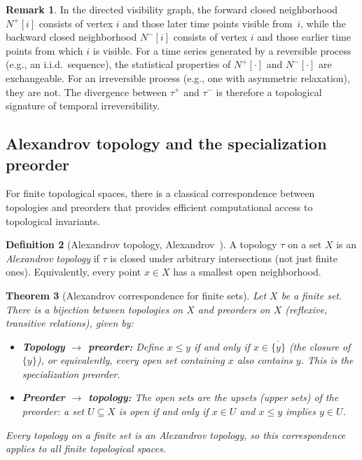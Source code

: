 \documentclass[11pt,a4paper]{article}
\theoremstyle{plain}
\newtheorem{theorem}{Theorem}[section]
\theoremstyle{definition}
\newtheorem{definition}[theorem]{Definition}
\newtheorem{remark}[theorem]{Remark}
\newcommand{\Nfwd}[1]{N^{+}[#1]}
\newcommand{\Nbwd}[1]{N^{-}[#1]}
\newcommand{\taufwd}{\tau^{+}}
\newcommand{\taubwd}{\tau^{-}}
\begin{document}
\begin{remark}\label{rem:irreversibility}
In the directed visibility graph, the forward closed neighborhood $\Nfwd{i}$
consists of vertex $i$ and those later time points visible from~$i$, while the
backward closed neighborhood $\Nbwd{i}$ consists of vertex $i$ and those
earlier time points from which $i$ is visible.  For a time series generated by
a reversible process (e.g., an i.i.d.\ sequence), the statistical properties
of $\Nfwd{\cdot}$ and $\Nbwd{\cdot}$ are exchangeable.  For an irreversible
process (e.g., one with asymmetric relaxation), they are not.  The divergence
between $\taufwd$ and $\taubwd$ is therefore a topological signature of
temporal irreversibility.
\end{remark}

\subsection{Alexandrov topology and the specialization preorder}%
\label{subsec:alexandrov}

For finite topological spaces, there is a classical correspondence between
topologies and preorders that provides efficient computational access to
topological invariants.

\begin{definition}[Alexandrov topology, Alexandrov~\cite{Alexandrov1937}]%
\label{def:alexandrov}
A topology $\tau$ on a set $X$ is an \emph{Alexandrov topology} if $\tau$ is
closed under arbitrary intersections (not just finite ones).  Equivalently,
every point $x \in X$ has a smallest open neighborhood.
\end{definition}

\begin{theorem}[Alexandrov correspondence for finite sets]%
\label{thm:alexandrov-correspondence}
Let $X$ be a finite set.  There is a bijection between topologies on $X$ and
preorders on $X$ (reflexive, transitive relations), given by:
\begin{itemize}[nosep]
  \item \textbf{Topology $\to$ preorder:}  Define $x \leq y$ if and only if
        $x \in \overline{\{y\}}$ (the closure of $\{y\}$), or equivalently,
        every open set containing $x$ also contains $y$.  This is the
        \emph{specialization preorder}.
  \item \textbf{Preorder $\to$ topology:}  The open sets are the \emph{upsets}
        (upper sets) of the preorder: a set $U \subseteq X$ is open if and only
        if $x \in U$ and $x \leq y$ implies $y \in U$.
\end{itemize}
Every topology on a finite set is an Alexandrov topology, so this
correspondence applies to all finite topological spaces.
\end{theorem}
\end{document}
